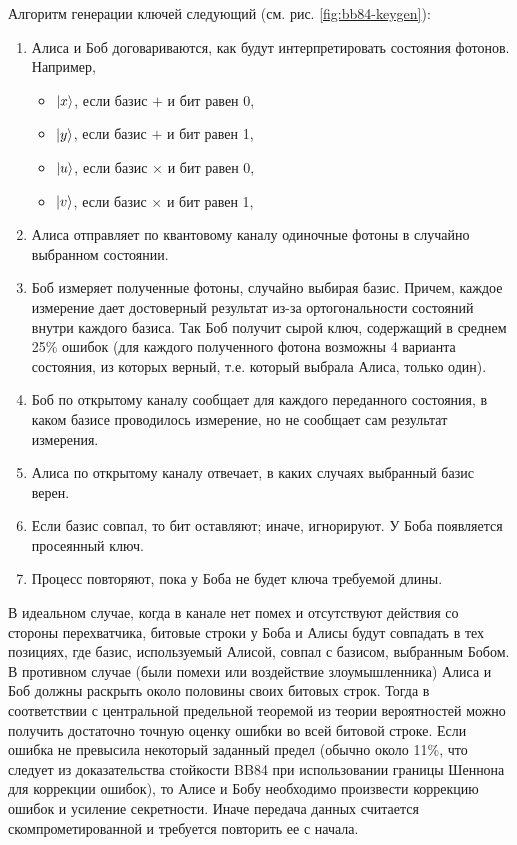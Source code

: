 \documentclass[a4paper,14pt]{extarticle}
\DeclarePairedDelimiter\ket{\lvert}{\rangle}
\begin{document}

Алгоритм генерации ключей следующий (см. рис. \ref{fig:bb84-keygen}):
\begin{enumerate}
    \item Алиса и Боб договариваются, как будут интерпретировать состояния
        фотонов. Например,

        \begin{itemize}
            \item $\ket{x}$, если базис $+$ и бит равен 0,
            \item $\ket{y}$, если базис $+$ и бит равен 1,
            \item $\ket{u}$, если базис $\times$ и бит равен 0,
            \item $\ket{v}$, если базис $\times$ и бит равен 1,
        \end{itemize}

    \item Алиса отправляет по квантовому каналу одиночные фотоны в случайно
        выбранном состоянии.
    \item Боб измеряет полученные фотоны, случайно выбирая базис. Причем,
        каждое измерение дает достоверный результат из-за ортогональности
        состояний внутри каждого базиса. Так Боб получит сырой ключ, содержащий
        в среднем 25\% ошибок (для каждого полученного фотона возможны 4
        варианта состояния, из которых верный, т.е. который выбрала Алиса,
        только один).
    \item Боб по открытому каналу сообщает для каждого переданного
        состояния, в каком базисе проводилось измерение, но не сообщает сам
        результат измерения.
    \item Алиса по открытому каналу отвечает, в каких случаях выбранный базис
        верен.
    \item Если базис совпал, то бит оставляют; иначе, игнорируют. У Боба
        появляется просеянный ключ.
    \item Процесс повторяют, пока у Боба не будет ключа требуемой длины.
\end{enumerate}


В идеальном случае, когда в канале нет помех и отсутствуют действия со стороны
перехватчика, битовые строки у Боба и Алисы будут совпадать в тех позициях, где
базис, используемый Алисой, совпал с базисом, выбранным Бобом. В противном
случае (были помехи или воздействие злоумышленника) Алиса и Боб должны раскрыть
около половины своих битовых строк. Тогда в соответствии с центральной
предельной теоремой из теории вероятностей можно получить достаточно точную
оценку ошибки во всей битовой строке. Если ошибка не превысила некоторый
заданный предел (обычно около 11\%, что следует из доказательства стойкости
BB84 при использовании границы Шеннона для коррекции ошибок), то Алисе и Бобу
необходимо произвести коррекцию ошибок и усиление секретности. Иначе передача
данных считается скомпрометированной и требуется повторить ее с начала.
\end{document}
